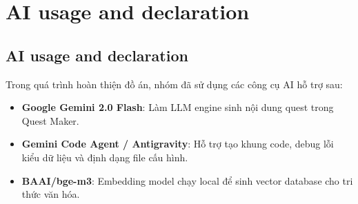 \section{AI usage and declaration}

\subsection{AI usage and declaration}

Trong quá trình hoàn thiện đồ án, nhóm đã sử dụng các công cụ AI hỗ trợ sau:
\begin{itemize}
    \item \textbf{Google Gemini 2.0 Flash}: Làm LLM engine sinh nội dung quest trong Quest Maker.
    \item \textbf{Gemini Code Agent / Antigravity}: Hỗ trợ tạo khung code, debug lỗi kiểu dữ liệu và định dạng file cấu hình.
    \item \textbf{BAAI/bge-m3}: Embedding model chạy local để sinh vector database cho tri thức văn hóa.
\end{itemize}
